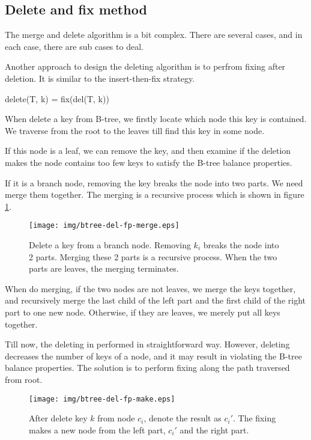 \documentclass{article}
\begin{document}
\subsection{Delete and fix method}

The merge and delete algorithm is a bit complex.
There are several cases, and in each case, there are sub cases to deal.

Another approach to design the deleting algorithm is to perfrom fixing
after deletion. It is similar to the insert-then-fix strategy.

\be
delete(T, k) = fix(del(T, k))
\ee

When delete a key from B-tree, we firstly locate
which node this key is contained. We traverse
from the root to the leaves till find this key in some node.

If this node is a leaf, we can remove the key, and then
examine if the deletion makes the node contains too few keys to
satisfy the B-tree balance properties.

If it is a branch node, removing the key breaks the node into
two parts. We need merge them together. The merging is a recursive
process which is shown in figure \ref{fig:del-fp-merge}.

\begin{figure}[htbp]
  \centering
  \texttt{[image: img/btree-del-fp-merge.eps]}
  \caption{Delete a key from a branch node. Removing $k_i$ breaks
the node into 2 parts. Merging these 2 parts
is a recursive process. When the two parts are leaves, the merging
terminates.} \label{fig:del-fp-merge}
\end{figure}

When do merging, if the two nodes are not leaves, we merge the keys
together, and recursively merge the last child of the left part
and the first child of the right part to one new node. Otherwise,
if they are leaves, we merely put all keys together.

Till now, the deleting in performed in straightforward way. However, deleting
decreases the number of keys of a node, and it may result in
violating the B-tree balance properties. The solution is to perform
fixing along the path traversed from root.

\begin{figure}[htbp]
  \centering
  \texttt{[image: img/btree-del-fp-make.eps]}
  \caption{After delete key $k$ from node $c_i$, denote the result
as $c_i'$. The fixing makes a new node from the
left part, $c_i'$ and the right part.}
  \label{fig:del-fp-make}
\end{figure}
\end{document}
